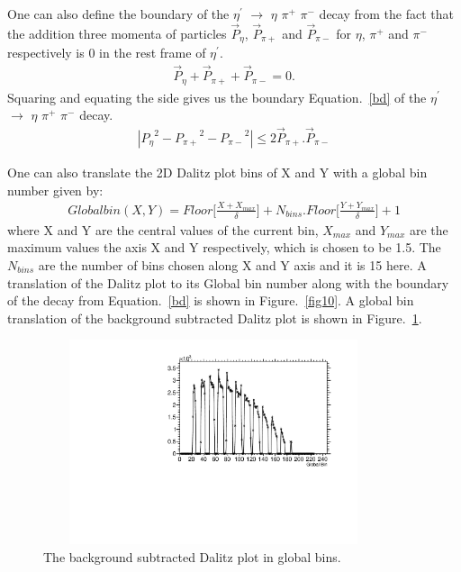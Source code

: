 One can also define the boundary of the $\eta^{\prime}$ $\rightarrow$ $\eta$ $\pi^{+}$ $\pi^{-}$ decay from the fact that the addition three momenta of particles $\vec{P}_{\eta}$, $\vec{P}_{\pi+}$ and $\vec{P}_{\pi-}$ for $\eta$, $\pi^{+}$ and $\pi^{-}$ respectively is 0 in the rest frame of $\eta^{\prime}$.
\begin{eqnarray*}
\vec{P}_{\eta} + \vec{P}_{\pi+} + \vec{P}_{\pi-} = 0.
\end{eqnarray*}
Squaring and equating the side gives us the boundary Equation.~\ref{bd} of the $\eta^{\prime}$ $\rightarrow$ $\eta$ $\pi^{+}$ $\pi^{-}$ decay.
\begin{eqnarray}
|{{P}_{\eta}}^2 - {{P}_{\pi+}}^2 - {{P}_{\pi-}}^2| \leq 2\vec{P}_{\pi+} . \vec{P}_{\pi-}
\label{bd}
\end{eqnarray}

One can also translate the 2D Dalitz plot bins of X and Y with a global bin number given by:
\begin{eqnarray*}
Globalbin(X,Y) = 
Floor \big[ \frac{X + X_{max}}{\delta} \big] + N_{bins} . Floor \big[ \frac{Y + Y_{max}}{\delta} \big] + 1
\label{gb}
\end{eqnarray*}
where X and Y are the central values of the current bin, $X_{max}$ and $Y_{max}$ are the maximum values the axis X and Y respectively, which is chosen to be 1.5. The $N_{bins}$ are the number of bins chosen along X and Y axis and it is 15 here. A translation of the Dalitz plot to its Global bin number along with the boundary of the decay from Equation.~\ref{bd} is shown in Figure.~\ref{fig10}. A global bin translation of the background subtracted Dalitz plot is shown in Figure.~\ref{DP_gl}.

\begin{figure}[ht!]
\centerline{
\includegraphics[width=10cm,height=6cm]{DP_Global.pdf}}
\caption{The background subtracted Dalitz plot in global bins.}
\label{DP_gl}
\end{figure}
 

